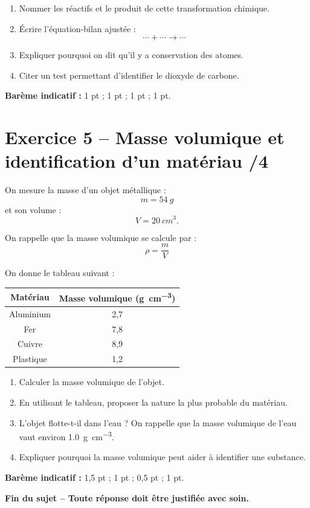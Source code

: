 \documentclass[11pt,a4paper]{article}
\begin{document}
\begin{enumerate}
    \item Nommer les réactifs et le produit de cette transformation chimique.
    \item Écrire l’équation-bilan ajustée :
    \[
    \cdots + \cdots \rightarrow \cdots
    \]
    \item Expliquer pourquoi on dit qu’il y a conservation des atomes.
    \item Citer un test permettant d’identifier le dioxyde de carbone.
\end{enumerate}

\textbf{Barème indicatif :} 1 pt ; 1 pt ; 1 pt ; 1 pt.

\section*{Exercice 5 -- Masse volumique et identification d’un matériau \hfill /4}

On mesure la masse d’un objet métallique : 
\[
m=\SI{54}{g}
\]
et son volume :
\[
V=\SI{20}{cm^3}.
\]

On rappelle que la masse volumique se calcule par :
\[
\rho=\frac{m}{V}
\]

On donne le tableau suivant :

\begin{center}
\begin{tabular}{|c|c|}
\hline
\textbf{Matériau} & \textbf{Masse volumique (\si{g.cm^{-3}})} \\
\hline
Aluminium & 2,7 \\
Fer & 7,8 \\
Cuivre & 8,9 \\
Plastique & 1,2 \\
\hline
\end{tabular}
\end{center}

\begin{enumerate}
    \item Calculer la masse volumique de l’objet.
    \item En utilisant le tableau, proposer la nature la plus probable du matériau.
    \item L’objet flotte-t-il dans l’eau ? On rappelle que la masse volumique de l’eau vaut environ \SI{1,0}{g.cm^{-3}}.
    \item Expliquer pourquoi la masse volumique peut aider à identifier une substance.
\end{enumerate}

\textbf{Barème indicatif :} 1,5 pt ; 1 pt ; 0,5 pt ; 1 pt.

\vspace{0.5cm}

\begin{center}
\textbf{Fin du sujet -- Toute réponse doit être justifiée avec soin.}
\end{center}
\end{document}
